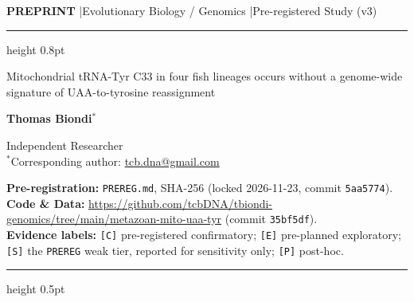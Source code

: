 \documentclass[11pt, a4paper]{article}
\begin{document}
{\noindent\small\color{slate}\textbf{PREPRINT} \quad|\quad Evolutionary Biology / Genomics \quad|\quad Pre-registered Study (v3)}
\vspace{0.35em}
{\color{rulegray}\hrule height 0.8pt}
\vspace{1.0em}

{\LARGE\bfseries\color{navy}\raggedright
Mitochondrial tRNA-Tyr C33 in four fish lineages occurs without a genome-wide signature of UAA-to-tyrosine reassignment\par}

\vspace{0.9em}
{\large\textbf{Thomas Biondi}$^{*}$}

\vspace{0.3em}
{\small\color{slate}
Independent Researcher\\
$^{*}$Corresponding author: \href{mailto:tcb.dna@gmail.com}{tcb.dna@gmail.com}
}

\vspace{0.6em}
{\footnotesize\color{slate}
\textbf{Pre-registration:} \texttt{PREREG.md}, SHA-256 \texttt{} (locked 2026-11-23, commit \texttt{5aa5774}).\\
\textbf{Code \& Data:} \url{https://github.com/tcbDNA/tbiondi-genomics/tree/main/metazoan-mito-uaa-tyr} (commit \texttt{35bf5df}).\\
\textbf{Evidence labels:} \texttt{[C]} pre-registered confirmatory; \texttt{[E]} pre-planned exploratory; \texttt{[S]} the \texttt{PREREG} weak tier, reported for sensitivity only; \texttt{[P]} post-hoc.
}

\vspace{0.8em}
{\color{rulegray}\hrule height 0.5pt}
\vspace{0.8em}

\end{document}
